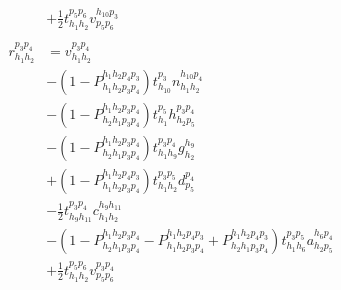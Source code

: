\documentclass{article}
\begin{document}
\begin{align}
                                      &+ \frac{1}{2} t ^{ p_{5} p_{6} } _{ h_{1} h_{2} } v ^{ h_{10} p_{3} } _{ p_{5} p_{6} }\tag{ccsd\_t2\_2\_6}\\
\nonumber\\
r ^{ p_{3} p_{4} } _{ h_{1} h_{2} }   &= v ^{ p_{3} p_{4} } _{ h_{1} h_{2} }\tag{ccsd\_t2\_1}\\
                                      &- \left(1- P^{ h_{1} h_{2} p_{4} p_{3}}_{ h_{1} h_{2} p_{3} p_{4}} \right) t ^{ p_{3} } _{ h_{10} } n ^{ h_{10} p_{4} } _{ h_{1} h_{2} }\tag{ccsd\_t2\_2}\\
                                      &- \left(1- P^{ h_{1} h_{2} p_{3} p_{4}}_{ h_{2} h_{1} p_{3} p_{4}} \right) t ^{ p_{5} } _{ h_{1} } h ^{ p_{3} p_{4} } _{ h_{2} p_{5} }\tag{ccsd\_t2\_3}\\
                                      &- \left(1- P^{ h_{1} h_{2} p_{3} p_{4}}_{ h_{2} h_{1} p_{3} p_{4}} \right) t ^{ p_{3} p_{4} } _{ h_{1} h_{9} } g ^{ h_{9} } _{ h_{2} }\tag{ccsd\_t2\_4}\\
                                      &+ \left(1- P^{ h_{1} h_{2} p_{4} p_{3}}_{ h_{1} h_{2} p_{3} p_{4}} \right) t ^{ p_{3} p_{5} } _{ h_{1} h_{2} } d ^{ p_{4} } _{ p_{5} }\tag{ccsd\_t2\_5}\\
                                      &- \frac{1}{2} t ^{ p_{3} p_{4} } _{ h_{9} h_{11} } c ^{ h_{9} h_{11} } _{ h_{1} h_{2} }\tag{ccsd\_t2\_6}\\
                                      &- \left(1- P^{ h_{1} h_{2} p_{3} p_{4}}_{ h_{2} h_{1} p_{3} p_{4}}- P^{ h_{1} h_{2} p_{4} p_{3}}_{ h_{1} h_{2} p_{3} p_{4}}+ P^{ h_{1} h_{2} p_{4} p_{3}}_{ h_{2} h_{1} p_{3} p_{4}} \right) t ^{ p_{3} p_{5} } _{ h_{1} h_{6} } a ^{ h_{6} p_{4} } _{ h_{2} p_{5} }\tag{ccsd\_t2\_7}\\
                                      &+ \frac{1}{2} t ^{ p_{5} p_{6} } _{ h_{1} h_{2} } v ^{ p_{3} p_{4} } _{ p_{5} p_{6} }\tag{ccsd\_t2\_8}
\end{align}
\end{document}

